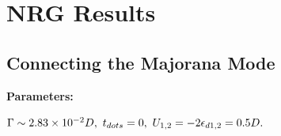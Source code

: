 \documentclass[showpacs,aps,prb,reprint,superscriptaddress]{revtex4-1}
\begin{document}















\section{NRG Results}
\label{sec:Results}


\subsection{Connecting the Majorana Mode \label{sub:t1=t2}}

\textbf{Parameters:}

    $\Gamma \sim 2.83\times10^{-2}D,\  t_{dots}=0 ,\  U_{1,2} = -2\epsilon_{d1,2} = 0.5D.$
\end{document}
